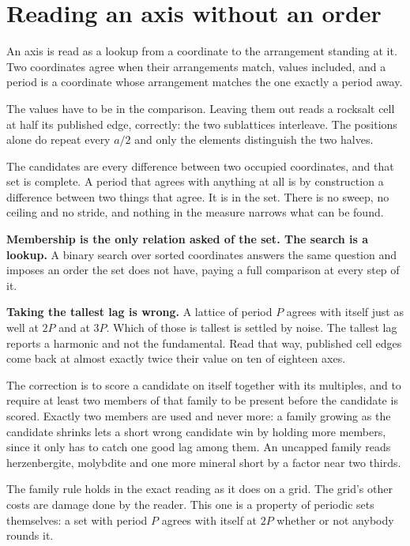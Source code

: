 \section{Reading an axis without an order}

An axis is read as a lookup from a coordinate to the arrangement standing at it. Two coordinates agree when their arrangements match, values included, and a period is a coordinate whose arrangement matches the one exactly a period away.

The values have to be in the comparison. Leaving them out reads a rocksalt cell at half its published edge, correctly: the two sublattices interleave. The positions alone do repeat every $a/2$ and only the elements distinguish the two halves.

The candidates are every difference between two occupied coordinates, and that set is complete. A period that agrees with anything at all is by construction a difference between two things that agree. It is in the set. There is no sweep, no ceiling and no stride, and nothing in the measure narrows what can be found.

\textbf{Membership is the only relation asked of the set. The search is a lookup.} A binary search over sorted coordinates answers the same question and imposes an order the set does not have, paying a full comparison at every step of it.

\textbf{Taking the tallest lag is wrong.} A lattice of period $P$ agrees with itself just as well at $2P$ and at $3P$. Which of those is tallest is settled by noise. The tallest lag reports a harmonic and not the fundamental. Read that way, published cell edges come back at almost exactly twice their value on ten of eighteen axes.

The correction is to score a candidate on itself together with its multiples, and to require at least two members of that family to be present before the candidate is scored. Exactly two members are used and never more: a family growing as the candidate shrinks lets a short wrong candidate win by holding more members, since it only has to catch one good lag among them. An uncapped family reads herzenbergite, molybdite and one more mineral short by a factor near two thirds.

The family rule holds in the exact reading as it does on a grid. The grid's other costs are damage done by the reader. This one is a property of periodic sets themselves: a set with period $P$ agrees with itself at $2P$ whether or not anybody rounds it.

